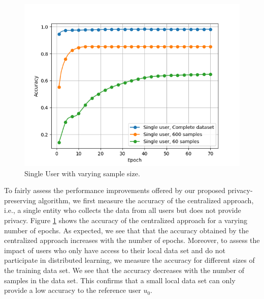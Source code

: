 \documentclass[conference]{IEEEtran}
\begin{document}
\begin{figure}[!h]
\centering
\includegraphics[width=\columnwidth, keepaspectratio]{SingleUserBaselinesGrid}
\caption{Single User with varying sample size.}
\label{fig:SingleUser}
\end{figure}
To fairly assess the performance improvements offered by our proposed privacy-preserving algorithm, we first measure the accuracy of
the centralized approach, i.e., a single entity who collects the data from all users but does not provide privacy. 
Figure \ref{fig:SingleUser} shows the accuracy of the centralized approach for a varying number of epochs. As expected, we see that
that the accuracy obtained by the centralized approach increases with the number of epochs. 
Moreover, to assess the impact of users who only have access to their local data set and do not participate in distributed
learning, we measure the accuracy for different sizes of the training data set. We see that the accuracy decreases with the number
of samples in the data set. This confirms that a small local data set can only provide a low accuracy to the reference user $u_0$.
\end{document}
